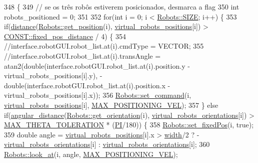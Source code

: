 \begin{DoxyCode}
348                                 \{
349     \textcolor{comment}{// se os três robôs estiverem posicionados, desmarca a flag}
350     \textcolor{keywordtype}{int} robots\_positioned = 0;
351 
352     \textcolor{keywordflow}{for}(\textcolor{keywordtype}{int} i = 0; i < \hyperlink{class_robots_ae9df2f1d345ad6740f0459956cdd4712}{Robots::SIZE}; i++) \{
353         \textcolor{keywordflow}{if}(\hyperlink{class_cam_cap_a6595a726e77091a8accf19e62dc55e41}{distance}(\hyperlink{class_robots_a1fca8f2f5070176faa6ba1efa2f1ff14}{Robots::get\_position}(i), 
      \hyperlink{class_cam_cap_afdbec56c1e17c308441cf2eaad035e45}{virtual\_robots\_positions}[i]) > \hyperlink{namespace_c_o_n_s_t_ae8d764cbcf03a0351752bff7d9cb30e6}{CONST::fixed\_pos\_distance} /
       4) \{
354             \textcolor{comment}{//interface.robotGUI.robot\_list.at(i).cmdType = VECTOR;}
355             \textcolor{comment}{//interface.robotGUI.robot\_list.at(i).transAngle =
       atan2(double(interface.robotGUI.robot\_list.at(i).position.y - virtual\_robots\_positions[i].y), - double(interface.robotGUI.robot\_list.at(i).position.x -
       virtual\_robots\_positions[i].x));}
356             \hyperlink{class_robots_ae5034abea0160aac1d77ad154ee77f64}{Robots::set\_command}(i, \hyperlink{class_cam_cap_afdbec56c1e17c308441cf2eaad035e45}{virtual\_robots\_positions}[i], 
      \hyperlink{camcap_8hpp_ad938167e5a9051bff1bf9df0316915dd}{MAX\_POSITIONING\_VEL});
357         \} \textcolor{keywordflow}{else} \textcolor{keywordflow}{if}(\hyperlink{class_cam_cap_abf57bed0fb3a45bb50947cd6f42698ea}{angular\_distance}(\hyperlink{class_robots_ae1d0829c1089322c8fac5830f65b13a0}{Robots::get\_orientation}(i), 
      \hyperlink{class_cam_cap_af7519e2b0d2139c7ef95482fa3c03c20}{virtual\_robots\_orientations}[i]) > 
      \hyperlink{camcap_8hpp_a1a6fe8e14fa30fbb43cb22f735248e8f}{MAX\_THETA\_TOLERATION} * (\hyperlink{camcap_8hpp_a598a3330b3c21701223ee0ca14316eca}{PI}/180)) \{
358             \hyperlink{class_robots_a427266e3332ab91bb3a78b5fb61a6c2c}{Robots::set\_fixedPos}(i, \textcolor{keyword}{true});
359             \textcolor{keywordtype}{double} angle = \hyperlink{class_cam_cap_afdbec56c1e17c308441cf2eaad035e45}{virtual\_robots\_positions}[i].x > 
      \hyperlink{class_cam_cap_ac22698ba7ba278ffd8f7af7bd86a62c9}{width}/2 ? -\hyperlink{class_cam_cap_af7519e2b0d2139c7ef95482fa3c03c20}{virtual\_robots\_orientations}[i] : 
      \hyperlink{class_cam_cap_af7519e2b0d2139c7ef95482fa3c03c20}{virtual\_robots\_orientations}[i];
360             \hyperlink{class_robots_a3b307142c41d7adc7614e6e4f2caf16b}{Robots::look\_at}(i, angle, \hyperlink{camcap_8hpp_ad938167e5a9051bff1bf9df0316915dd}{MAX\_POSITIONING\_VEL});

\end{DoxyCode}
